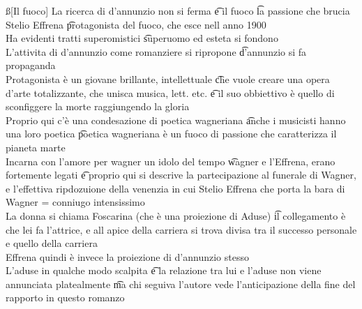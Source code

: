 \documentclass[12pt]{article}
\begin{document}
\ss[Il fuoco]
La ricerca di d'annunzio non si ferma \t e il fuoco \t la passione che brucia \\
Stelio Effrena \t protagonista del fuoco, che esce nell anno 1900 \\
Ha evidenti tratti superomistici \t superuomo ed esteta si fondono \\
L'attivita di d'annunzio come romanziere si ripropone \t d'annunzio si fa propaganda \\
Protagonista è un giovane brillante, intellettuale \t che vuole creare una opera d'arte totalizzante, che unisca musica, lett. etc. \t e il suo obbiettivo è quello di sconfiggere la morte raggiungendo la gloria \\
Proprio qui c'è una condesazione di poetica wagneriana \t anche i musicisti hanno una loro poetica \t poetica wagneriana è un fuoco di passione che caratterizza il pianeta marte \\
Incarna con l'amore per wagner un idolo del tempo \t wagner e l'Effrena, erano fortemente legati \t e proprio qui si descrive la partecipazione al funerale di Wagner, e l'effettiva ripdozuione della venenzia in cui Stelio Effrena che porta la bara di Wagner = conniugo intensissimo \\
La donna si chiama Foscarina (che è una proiezione di Aduse) \t il collegamento è che lei fa l'attrice, e all apice della carriera si trova divisa tra il successo personale e quello della carriera \\
Effrena quindi è invece la proiezione di d'annunzio stesso \\
L'aduse in qualche modo scalpita \t e la relazione tra lui e l'aduse non viene annunciata platealmente \t ma chi seguiva l'autore vede l'anticipazione della fine del rapporto in questo romanzo
\end{document}
